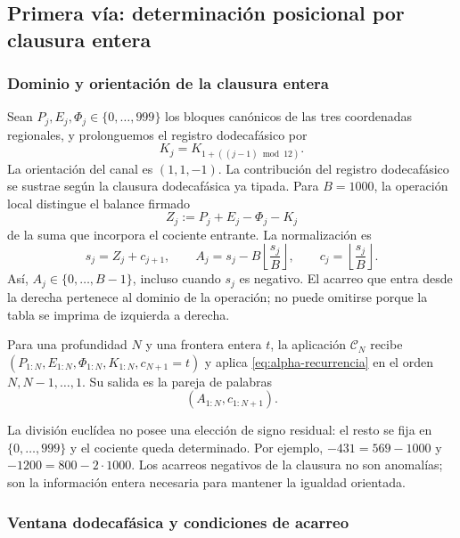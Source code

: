 \subsection{Primera vía: determinación posicional por clausura entera}
\subsubsection{Dominio y orientación de la clausura entera}
\label{subsec:alpha-dominio}

Sean \(P_j,E_j,\Phi_j\in\{0,\ldots,999\}\) los bloques canónicos de
las tres coordenadas regionales, y prolonguemos el registro dodecafásico por
\[
 K_j=K_{1+((j-1)\bmod12)}.
\]
La orientación del canal es \((1,1,-1)\). La contribución del registro dodecafásico se
sustrae según la clausura dodecafásica ya tipada. Para \(B=1000\), la
operación local distingue el balance firmado
\[
 Z_j:=P_j+E_j-\Phi_j-K_j
\]
de la suma que incorpora el cociente entrante. La normalización es
\begin{equation}
 s_j=Z_j+c_{j+1},\qquad
 A_j=s_j-B\left\lfloor\frac{s_j}{B}\right\rfloor,
 \qquad c_j=\left\lfloor\frac{s_j}{B}\right\rfloor.
 \label{eq:alpha-recurrencia}
\end{equation}
Así, \(A_j\in\{0,\ldots,B-1\}\), incluso cuando \(s_j\) es
negativo. El acarreo que entra desde la derecha pertenece al dominio de
la operación; no puede omitirse porque la tabla se imprima de izquierda
a derecha.

\begin{definition}
\label{def:alpha-finita}
Para una profundidad \(N\) y una frontera entera \(t\), la aplicación
\(\mathcal C_N\) recibe
\((P_{1:N},E_{1:N},\Phi_{1:N},K_{1:N},c_{N+1}=t)\) y aplica
\eqref{eq:alpha-recurrencia} en el orden \(N,N-1,\ldots,1\). Su salida
es la pareja de palabras
\[
 (A_{1:N},c_{1:N+1}).
\]
\end{definition}

La división euclídea no posee una elección de signo residual: el resto se
fija en \(\{0,\ldots,999\}\) y el cociente queda determinado. Por
ejemplo, \(-431=569-1000\) y \(-1200=800-2\cdot1000\). Los
acarreos negativos de la clausura no son anomalías; son la información
entera necesaria para mantener la igualdad orientada.

\subsubsection{Ventana dodecafásica y condiciones de acarreo}
\label{subsec:alpha-ventana}

